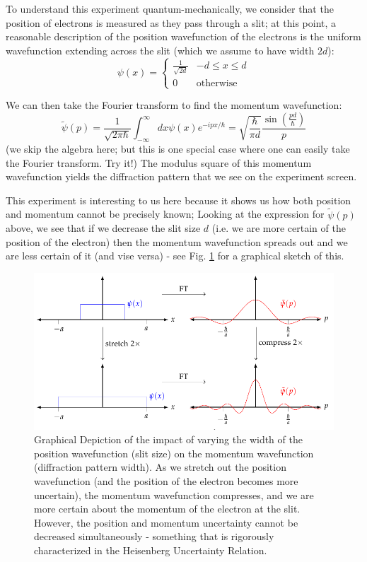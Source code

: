 To understand this experiment quantum-mechanically, we consider that the position of electrons is measured as they pass through a slit; at this point, a reasonable description of the position wavefunction of the electrons is the uniform wavefunction extending across the slit (which we assume to have width $2d$):
\begin{equation}
    \psi(x) = \begin{cases}
        \frac{1}{\sqrt{2d}} & -d \leq x \leq d
        \\ 0 & \text{otherwise}
    \end{cases}
\end{equation}

We can then take the Fourier transform to find the momentum wavefunction:
\begin{equation}
    \tilde{\psi}(p) = \frac{1}{\sqrt{2\pi\hbar}}\int_{-\infty}^\infty dx \psi(x)e^{-ipx/\hbar} = \sqrt{\frac{\hbar}{\pi d}}\frac{\sin(\frac{pd}{\hbar})}{p}
\end{equation}
(we skip the algebra here; but this is one special case where one can easily take the Fourier transform. Try it!) The modulus square of this momentum wavefunction yields the diffraction pattern that we see on the experiment screen.

This experiment is interesting to us here because it shows us how both position and momentum cannot be precisely known; Looking at the expression for $\tilde{\psi}(p)$ above, we see that if we decrease the slit size $d$ (i.e. we are more certain of the position of the electron) then the momentum wavefunction spreads out and we are less certain of it (and vise versa) - see Fig. \ref{fig-FTHUP} for a graphical sketch of this.

\begin{figure}[htbp]
    \centering
    \includegraphics[]{Images/fig-FTHUP.pdf}
    \caption{Graphical Depiction of the impact of varying the width of the position wavefunction (slit size) on the momentum wavefunction (diffraction pattern width). As we stretch out the position wavefunction (and the position of the electron becomes more uncertain), the momentum wavefunction compresses, and we are more certain about the momentum of the electron at the slit. However, the position and momentum uncertainty cannot be decreased simultaneously - something that is rigorously characterized in the Heisenberg Uncertainty Relation.}
    \label{fig-FTHUP}
\end{figure}

